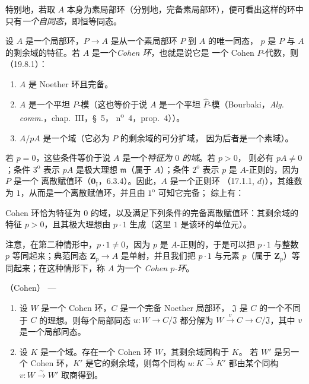 特别地，若取 $A$ 本身为素局部环（分别地，完备素局部环），便可看出这样的环中
只有\emph{一个自同态}，即恒等同态。


\begin{definition}[19.8.4]
\label{0.19.8.4-fr}
设 $A$ 是一个局部环，$P\to A$ 是从一个素局部环 $P$ 到 $A$ 的唯一同态，
$p$ 是 $P$ 与 $A$ 的剩余域的特征。若 $A$ 是一个\emph{Cohen 环}，也就是说它是
一个 Cohen $P$-代数，则（19.8.1）：
\begin{enumerate}
  \item[$1^{\mathrm o}$] $A$ 是 Noether 环且完备。
  \item[$2^{\mathrm o}$] $A$ 是一个平坦 $P$-模（这也等价于说 $A$ 是一个平坦
  $\widehat P$-模（Bourbaki，\emph{Alg. comm.}，chap.~III，§~5，
  n\textsuperscript{o}~4，prop.~4））。
  \item[$3^{\mathrm o}$] $A/pA$ 是一个域（它必为 $P$ 的剩余域的可分扩域，
  因为后者是一个素域）。
\end{enumerate}
\end{definition}

若 $p=0$，这些条件等价于说 $A$ 是一个\emph{特征为 $0$ 的域}。若 $p>0$，
则必有 $pA\neq0$；条件 $3^{\mathrm o}$ 表示 $pA$ 是极大理想
$\mathfrak m$（属于 $A$）；条件 $2^{\mathrm o}$ 表示 $p$ 是 $A$-正则的，因为 $P$ 是一个
离散赋值环（$\mathbf 0_{\mathrm I}$，6.3.4）。因此，$A$ 是一个正则环
（17.1.1, $d)$），其维数为 $1$，从而是一个离散赋值环，并且由 $1^{\mathrm o}$ 可知它完备；
综上有：

\begin{proposition}[19.8.5]
\label{0.19.8.5-fr}
Cohen 环恰为特征为 $0$ 的域，以及满足下列条件的完备离散赋值环：其剩余域的特征
$p>0$，且其极大理想由 $p\cdot1$ 生成（这里 $1$ 是该环的单位元）。
\end{proposition}

注意，在第二种情形中，$p\cdot1\neq0$，因为 $p$ 是 $A$-正则的，于是可以把
$p\cdot1$ 与整数 $p$ 等同起来；典范同态 $\mathbf Z_p\to A$ 是单射，并且我们把
$p\cdot1$ 与元素 $p$（属于 $\mathbf Z_p$）等同起来；在这种情形下，称 $A$ 为一个
\emph{Cohen $p$-环}。

\begin{theorem}[19.8.6]
\label{0.19.8.6-fr}
\textup{（Cohen）} ---
\begin{enumerate}
  \item[(i)] 设 $W$ 是一个 Cohen 环，$C$ 是一个完备 Noether 局部环，
  $\mathfrak J$ 是 $C$ 的一个不同于 $C$ 的理想。则每个局部同态
  $u:W\to C/\mathfrak J$ 都分解为
  $W\xrightarrow{v}C\to C/\mathfrak J$，其中 $v$ 是一个局部同态。
  \item[(ii)] 设 $K$ 是一个域。存在一个 Cohen 环 $W$，其剩余域同构于 $K$。
  若 $W'$ 是另一个 Cohen 环，$K'$ 是它的剩余域，则每个同构
  $u:K\xrightarrow{\sim}K'$ 都由某个同构 $v:W\xrightarrow{\sim}W'$ 取商得到。
\end{enumerate}
\end{theorem}

